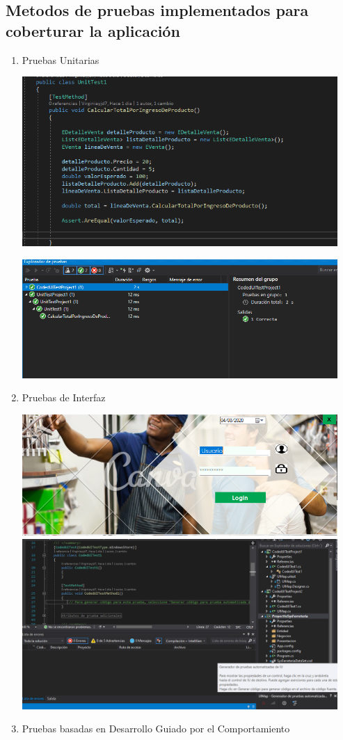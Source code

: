\documentclass[preprint,12pt]{elsarticle}
\begin{document}
\subsection{\textbf{  Metodos de pruebas implementados para coberturar la aplicación }}
\renewcommand{\labelenumi}{{\theenumi})}
\begin{enumerate}
\item  Pruebas Unitarias  
\begin{center}
	\includegraphics[width=12cm]{./imagen/calcular} 
	\end{center}
\begin{center}
	\includegraphics[width=12cm]{./imagen/pruebas} 
	\end{center}
\item  Pruebas de Interfaz 
\begin{center}
	\includegraphics[width=12cm]{./imagen/interface} 
\includegraphics[width=12cm]{./imagen/f} 
	\end{center}
\item Pruebas basadas en Desarrollo Guiado por el Comportamiento
\end{enumerate}

	\newpage
	
		
\end{document}
